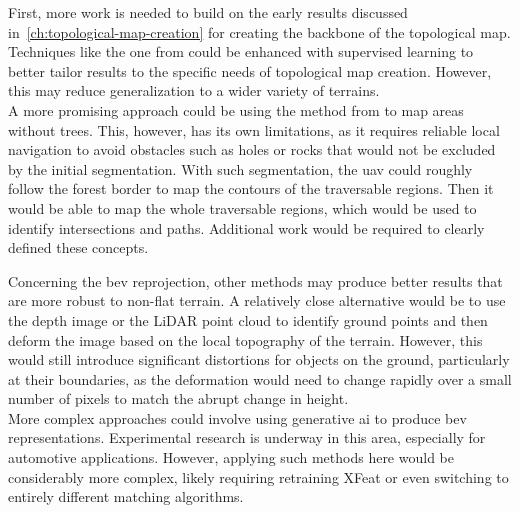 First, more work is needed to build on the early results discussed in~\ref{ch:topological-map-creation} for creating the backbone of the topological map.\\
Techniques like the one from \textcite{rufus_blas_fast_2008} could be enhanced with supervised learning to better
tailor results to the specific needs of topological map creation.
However, this may reduce generalization to a wider variety of terrains.\\
A more promising approach could be using the method from \textcite{bosch_journal_2020} to map areas without trees.
This, however, has its own limitations, as it requires reliable local navigation to avoid obstacles such as holes or rocks
that would not be excluded by the initial segmentation.
With such segmentation, the \gls{uav} could roughly follow the forest border to map the contours of the traversable regions.
Then it would be able to map the whole traversable regions, which would be used to identify intersections and paths.
Additional work would be required to clearly defined these concepts.

Concerning the \gls{bev} reprojection, other methods may produce better results that are more robust to non-flat terrain.
A relatively close alternative would be to use the depth image or the LiDAR point cloud to identify ground points and
then deform the image based on the local topography of the terrain.
However, this would still introduce significant distortions for objects on the ground, particularly at their boundaries,
as the deformation would need to change rapidly over a small number of pixels to match the abrupt change in height.\\
More complex approaches could involve using generative \gls{ai} to produce \gls{bev} representations.
Experimental research is underway in this area, especially for automotive applications.
However, applying such methods here would be considerably more complex, likely requiring retraining XFeat or even
switching to entirely different matching algorithms.


